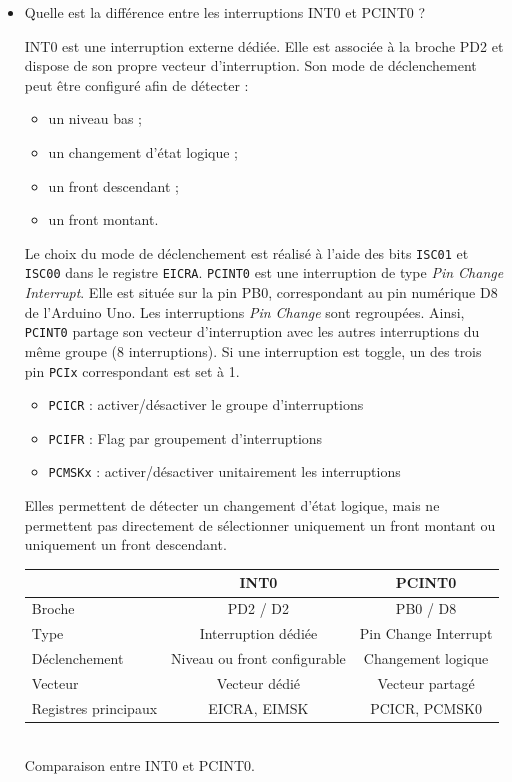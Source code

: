 \documentclass[a4paper,11pt]{article}
\begin{document}
\begin{itemize}
    \item Quelle est la différence entre les interruptions INT0 et PCINT0 ?
    \begin{solution}
    INT0 est une interruption externe dédiée. Elle est associée à la broche PD2 et dispose de son propre vecteur d'interruption. Son mode de déclenchement peut être configuré afin de détecter : 
    \begin{itemize} 
        \item un niveau bas ; 
        \item un changement d'état logique ; 
        \item un front descendant ; 
        \item un front montant.
    \end{itemize} 
    Le choix du mode de déclenchement est réalisé à l'aide des bits \texttt{ISC01} et \texttt{ISC00} dans le registre \texttt{EICRA}. 
    \texttt{PCINT0} est une interruption de type \textit{Pin Change Interrupt}. Elle est située sur la pin PB0, correspondant au pin numérique D8 de l'Arduino Uno. 
    Les interruptions \textit{Pin Change} sont regroupées. Ainsi, \texttt{PCINT0} partage son vecteur d'interruption avec les autres interruptions du même groupe (8 interruptions). Si une interruption est toggle, un des trois pin \texttt{PCIx} correspondant est set à 1.
    \begin{itemize}
        \item \texttt{PCICR} : activer/désactiver le groupe d'interruptions
        \item \texttt{PCIFR} : Flag par groupement d'interruptions
        \item \texttt{PCMSKx} : activer/désactiver unitairement les interruptions 
    \end{itemize}
    
    Elles permettent de détecter un changement d'état logique, mais ne permettent pas directement de sélectionner uniquement un front montant ou uniquement un front descendant.
    \\
    
    \centering 
    \begin{tabular}{|l|c|c|} \hline
        & \textbf{INT0} & \textbf{PCINT0} \\ \hline
        Broche & PD2 / D2 & PB0 / D8 \\ \hline
        Type & Interruption dédiée & Pin Change Interrupt \\ \hline
        Déclenchement & Niveau ou front configurable & Changement logique \\ \hline
        Vecteur & Vecteur dédié & Vecteur partagé \\ \hline
        Registres principaux & EICRA, EIMSK & PCICR, PCMSK0 \\ \hline
    \end{tabular} \\
    Comparaison entre INT0 et PCINT0.
        

\end{solution}
\end{itemize}
\end{document}
